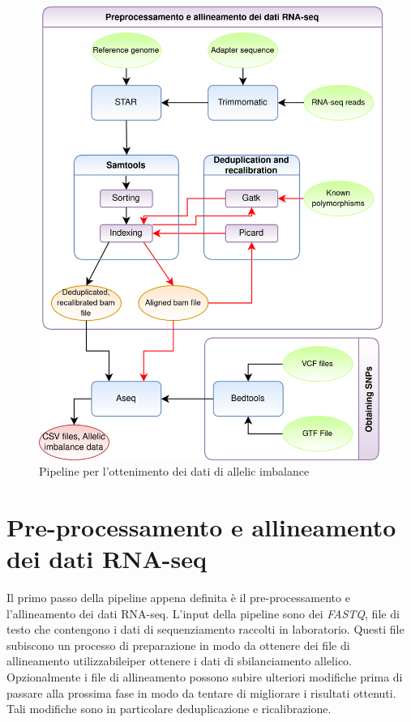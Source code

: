   \begin{figure}[H]
    \label{fig:proj_pipeline}
    \centering
    \includegraphics[scale=0.2]{pipeline.png}
    \caption{Pipeline per l'ottenimento dei dati di allelic imbalance}
  \end{figure}

  \section{Pre-processamento e allineamento dei dati RNA-seq}
  \label{sec:pre_all_rna_seq}
  Il primo passo della pipeline appena definita \`e il pre-processamento e l'allineamento dei dati RNA-seq.
  L'input della pipeline sono dei \emph{FASTQ}, file di testo che contengono i dati di sequenziamento raccolti in laboratorio. 
  Questi file subiscono un processo di preparazione in modo da ottenere dei file di allineamento utilizzabileiper ottenere i dati di sbilanciamento allelico.
  Opzionalmente i file di allineamento possono subire ulteriori modifiche prima di passare alla prossima fase in modo da tentare di migliorare i risultati ottenuti.
  Tali modifiche sono in particolare deduplicazione e ricalibrazione.

